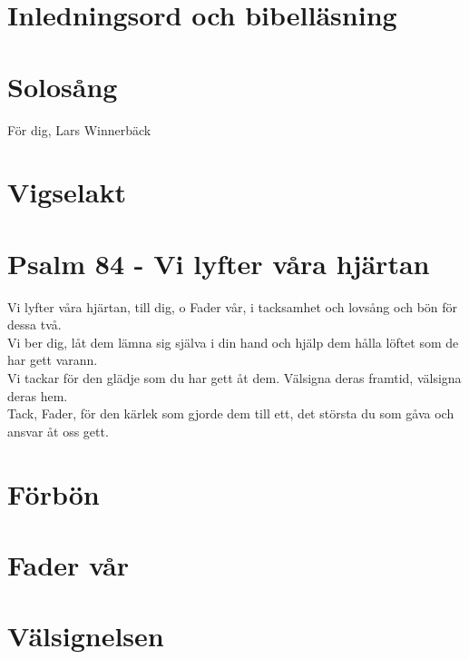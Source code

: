 \documentclass[a5paper, 12pt]{article}
\begin{document}
\begin{center}
	\section{Inledningsord och bibelläsning}	

	\section{Solosång}
	För dig, Lars Winnerbäck
	\vspace{0.0cm}
	
	\section{Vigselakt}
	\vspace{0.4cm}
	
\begin{minipage}{\textwidth}
\begin{center}
	\section{Psalm 84 - Vi lyfter våra hjärtan}
	Vi lyfter våra hjärtan, till dig, o Fader vår, i tacksamhet och lovsång och bön för dessa två.      \\
	\vspace{0.2cm}
	Vi ber dig, låt dem lämna sig själva i din hand och hjälp dem hålla löftet som de har gett varann.   \\
	\vspace{0.2cm}
	Vi tackar för den glädje som du har gett åt dem. Välsigna deras framtid, välsigna deras hem.         \\
	\vspace{0.2cm}
	Tack, Fader, för den kärlek som gjorde dem till ett, det största du som gåva och ansvar åt oss gett. \\
	
	\section{Förbön}	
	\vspace{0.4cm}
	\section{Fader vår}
	\vspace{0.4cm}
	\section{Välsignelsen}	
	\vspace{0.4cm}
\end{center}
\end{minipage}
	

\end{center}
\end{document}

